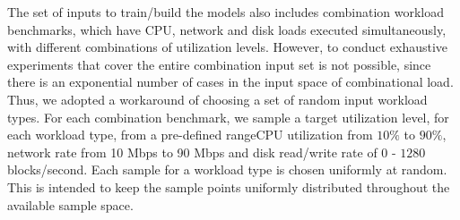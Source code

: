 
% 

% 
% 


The set of inputs to train/build the models also includes 
combination workload benchmarks, which have CPU, network and disk
loads executed simultaneously, with different combinations of 
utilization levels.
However, to conduct exhaustive experiments that cover the
entire combination input set is not possible, since there is an
exponential number of cases in the input space of combinational load.
Thus, we adopted a workaround of choosing a set of random input 
workload types. 
For each combination benchmark, we sample a target utilization level, for 
each workload type, from a pre-defined range\textemdash{}CPU utilization from $10\%$ to 
$90\%$, network rate from 10 Mbps to 90 Mbps and disk read/write rate
of $0$ - $1280$ blocks/second. Each sample for a workload type is chosen
uniformly at random. 
This is intended to keep the sample points
uniformly distributed throughout the available sample space. 

